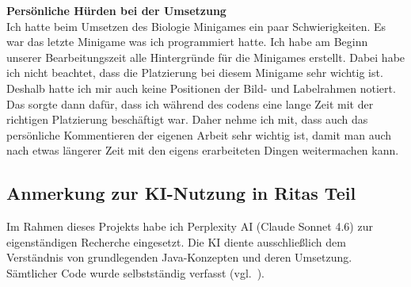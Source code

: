 \textbf{Persönliche Hürden bei der Umsetzung} \\
Ich hatte beim Umsetzen des Biologie Minigames ein paar Schwierigkeiten. Es war das letzte Minigame was ich programmiert hatte. Ich habe am Beginn unserer Bearbeitungszeit alle Hintergründe für die Minigames erstellt. Dabei habe ich nicht beachtet, dass die Platzierung bei diesem Minigame sehr wichtig ist. Deshalb hatte ich mir auch keine Positionen der Bild- und Labelrahmen notiert.
Das sorgte dann dafür, dass ich während des codens eine lange Zeit mit der richtigen Platzierung beschäftigt war. Daher nehme ich mit, dass auch das persönliche \glqq{}Kommentieren\grqq{} der eigenen Arbeit sehr wichtig ist, damit man auch nach etwas längerer Zeit mit den eigens erarbeiteten Dingen weitermachen kann.


\subsection{Anmerkung zur KI-Nutzung in Ritas Teil}
Im Rahmen dieses Projekts habe ich Perplexity AI
(Claude Sonnet 4.6) zur eigenständigen Recherche eingesetzt.
Die KI diente ausschließlich dem Verständnis von grundlegenden Java-Konzepten und deren Umsetzung.
Sämtlicher Code wurde selbstständig verfasst (vgl.~\cite{PerplexityAI}).